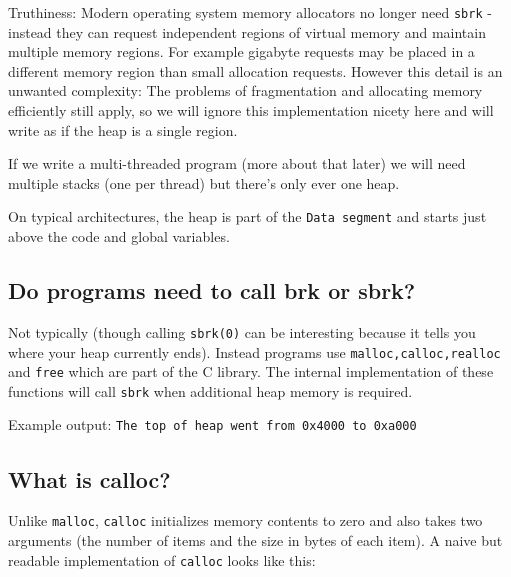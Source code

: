 Truthiness: Modern operating system memory allocators no longer need
\texttt{sbrk} - instead they can request independent regions of virtual
memory and maintain multiple memory regions. For example gigabyte
requests may be placed in a different memory region than small
allocation requests. However this detail is an unwanted complexity: The
problems of fragmentation and allocating memory efficiently still apply,
so we will ignore this implementation nicety here and will write as if
the heap is a single region.

If we write a multi-threaded program (more about that later) we will
need multiple stacks (one per thread) but there's only ever one heap.

On typical architectures, the heap is part of the \texttt{Data\ segment}
and starts just above the code and global variables.

\subsection{Do programs need to call brk or
sbrk?}\label{do-programs-need-to-call-brk-or-sbrk}

Not typically (though calling \texttt{sbrk(0)} can be interesting
because it tells you where your heap currently ends). Instead programs
use \texttt{malloc,calloc,realloc} and \texttt{free} which are part of
the C library. The internal implementation of these functions will call
\texttt{sbrk} when additional heap memory is required.

\begin{Shaded}
\end{Shaded}

Example output:
\texttt{The\ top\ of\ heap\ went\ from\ 0x4000\ to\ 0xa000}

\subsection{What is calloc?}\label{what-is-calloc}

Unlike \texttt{malloc}, \texttt{calloc} initializes memory contents to
zero and also takes two arguments (the number of items and the size in
bytes of each item). A naive but readable implementation of
\texttt{calloc} looks like this:

